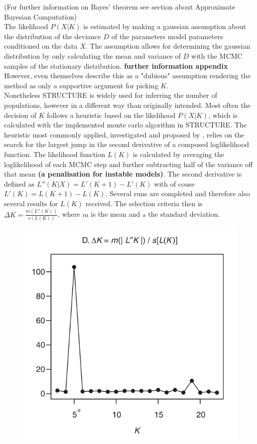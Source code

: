 \documentclass[a4paper, 11pt]{article}
\begin{document}
(For further information on Bayes' theorem see section about Approximate Bayesian Computation)\\
The likelihood $P(X|K)$ is estimated by making a gaussian assumption about the distribution of the deviance $D$ of the parameters model parameters conditioned on the data $X$. The assumption allows for determining the gaussian distribution by only calculating the mean and variance of $D$ with the MCMC samples of the stationary distribution. \textbf{further information appendix} However, even \textcite{pritchard2000inference} themselves describe this as a "dubious" assumption rendering the method as only a supportive argument for picking $K$.\\
Nonetheless STRUCTURE is widely used for inferring the number of populations, however in a different way than originally intended. Most often the decision of $K$ follows a heuristic based on the likelihood $P(X|K)$, which is calculated with the implemented monte carlo algorithm in STRUCTURE. The heuristic most commonly applied, investigated and proposed by \cite{evanno2005detecting}, relies on the search for the largest jump in the second derivative of a composed loglikelihood function. The likelihood function $L(K)$ is calculated by averaging the loglikelihood of each MCMC step and further subtracting half of the variance off that mean \textbf{(a penalisation for instable models)}. The second derivative is defined as $L''(K|X) = L'(K+1) - L'(K)$ with of couse $L'(K) = L(K+1) - L(K)$. Several runs are completed and therefore also several results for $L(K)$ received. The selection criteria then is $\Delta K = \frac{m(L''(K))}{s(L(K))}$, where $m$ is the mean and $s$ the standard deviation. \\
\begin{figure}
\includegraphics[scale=0.4]{delta_K} 
\end{figure}
\end{document}
